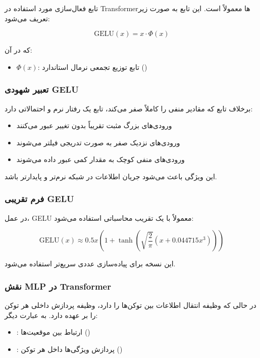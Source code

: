 \documentclass{article}
\begin{document}
تابع فعال‌سازی مورد استفاده در Transformerها معمولاً  است. این تابع به صورت زیر تعریف می‌شود:

\[
\text{GELU}(x) = x \cdot \Phi(x)
\]

که در آن:

\begin{itemize}
	\item \( \Phi(x) \): تابع توزیع تجمعی نرمال استاندارد ()
\end{itemize}

\subsubsection*{تعبیر شهودی GELU}

برخلاف تابع  که مقادیر منفی را کاملاً صفر می‌کند، تابع  یک رفتار نرم و احتمالاتی دارد:

\begin{itemize}
	\item ورودی‌های بزرگ مثبت تقریباً بدون تغییر عبور می‌کنند
	\item ورودی‌های نزدیک صفر به صورت تدریجی فیلتر می‌شوند
	\item ورودی‌های منفی کوچک به مقدار کمی عبور داده می‌شوند
\end{itemize}

این ویژگی باعث می‌شود جریان اطلاعات در شبکه نرم‌تر و پایدارتر باشد.

\subsubsection*{فرم تقریبی GELU}

در عمل، GELU معمولاً با یک تقریب محاسباتی استفاده می‌شود:

\[
\text{GELU}(x) \approx 0.5x \left(1 + \tanh\left(\sqrt{\frac{2}{\pi}} (x + 0.044715 x^3)\right)\right)
\]

این نسخه برای پیاده‌سازی عددی سریع‌تر استفاده می‌شود.

\subsubsection*{نقش MLP در Transformer}

در حالی که  وظیفه انتقال اطلاعات بین توکن‌ها را دارد،  وظیفه پردازش داخلی هر توکن را بر عهده دارد. به عبارت دیگر:

\begin{itemize}
	\item {}: ارتباط بین موقعیت‌ها ()
	\item {}: پردازش ویژگی‌ها داخل هر توکن ()
\end{itemize}
\end{document}
